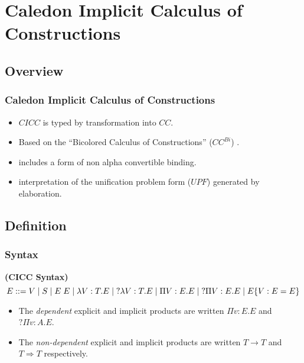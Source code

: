 \section[$CICC$]{Caledon Implicit Calculus of Constructions}


\subsection{Overview}

\begin{frame}
\frametitle{Caledon Implicit Calculus of Constructions}
\begin{itemize}
\item $CICC$ is typed by transformation into $CC$.
\item Based on the ``Bicolored Calculus of Constructions'' ($CC^{Bi}$) \citep{luther2001more}.
\item includes a form of non alpha convertible binding.
\item interpretation of the unification problem form ($UPF$) generated by elaboration.
\end{itemize}
\end{frame}




\subsection{Definition}

\begin{frame}
\frametitle{Syntax}
\begin{definition}
\textbf{(CICC Syntax)}
\[ 
E ::= 
V 
\; | \; S 
\; | \; E\;E 
\; | \; \lambda V : T. E 
\; | \; ?\lambda V : T. E 
\; | \; \Pi V : E . E 
\; | \; ?\Pi V : E . E 
\; | \; E \{ V : E = E \}
\]

\end{definition}

\begin{itemize}
\item The \textit{dependent} explicit and implicit products are written $\Pi v : E . E $ and $?\Pi v : A . E$. 
\item The \textit{non-dependent} explicit and implicit products are written $T \rightarrow T$ 
      and $T \Rightarrow T$ respectively.
\end{itemize}
\end{frame}


